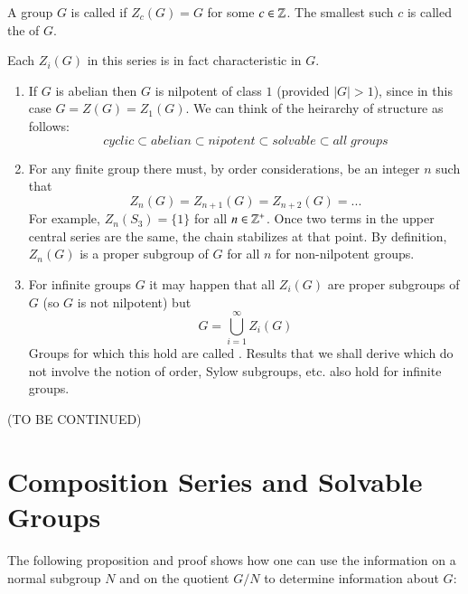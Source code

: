 \documentclass[12pt, a4paper, twoside, openright, titlepage]{book}
\begin{document}
\begin{defn}{}{}
    A group $G$ is called  if $Z_c(G) = G$ for some $c \in \mathbb Z$. The smallest such $c$ is called the  of $G$.
\end{defn}


Each $Z_i(G)$ in this series is in fact characteristic in $G$.

\begin{rmk}{}{}
    \leavevmode
    \begin{enumerate}
        \item If $G$ is abelian then $G$ is nilpotent of class $1$ (provided $|G| > 1$), since in this case $G = Z(G) = Z_1(G)$. We can think of the heirarchy of structure as follows: \begin{equation*}
                cyclic\subset abelian \subset nipotent \subset solvable \subset all\;groups
        \end{equation*}
        \item For any finite group there must, by order considerations, be an integer $n$ such that \begin{equation*}
                Z_n(G) = Z_{n+1}(G) = Z_{n+2}(G) = ...
        \end{equation*}
            For example, $Z_n(S_3) = \{1\}$ for all $n \in \mathbb Z^+$. Once two terms in the upper central series  are the same, the chain stabilizes at that point. By definition, $Z_n(G)$ is a proper subgroup of $G$ for all $n$ for non-nilpotent groups.
        \item For infinite groups $G$ it may happen that all $Z_i(G)$ are proper subgroups of $G$ (so $G$ is not nilpotent) but \begin{equation*}
                G = \bigcup\limits_{i=1}^{\infty}Z_i(G)
        \end{equation*}
            Groups for which this hold are called . Results that we shall derive which do not involve the notion of order, Sylow subgroups, etc. also hold for infinite groups.
    \end{enumerate}
\end{rmk}

(TO BE CONTINUED)


\section{\textsection Composition Series and Solvable Groups}

The following proposition and proof shows how one can use the information on a normal subgroup $N$ and on the quotient $G/N$ to determine information about $G$:
\end{document}

